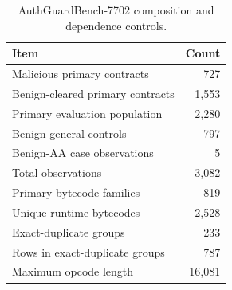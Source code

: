 \begin{table}[t]
  \centering
  \caption{AuthGuardBench-7702 composition and dependence controls.}
  \label{tab:dataset}
  \scriptsize
  \setlength{\tabcolsep}{4.0pt}
  \begin{tabular}{@{}lr@{}}
    \toprule
    Item & Count \\
    \midrule
    Malicious primary contracts & 727 \\
    Benign-cleared primary contracts & 1,553 \\
    Primary evaluation population & 2,280 \\
    Benign-general controls & 797 \\
    Benign-AA case observations & 5 \\
    Total observations & 3,082 \\
    Primary bytecode families & 819 \\
    Unique runtime bytecodes & 2,528 \\
    Exact-duplicate groups & 233 \\
    Rows in exact-duplicate groups & 787 \\
    Maximum opcode length & 16,081 \\
    \bottomrule
  \end{tabular}
\end{table}

